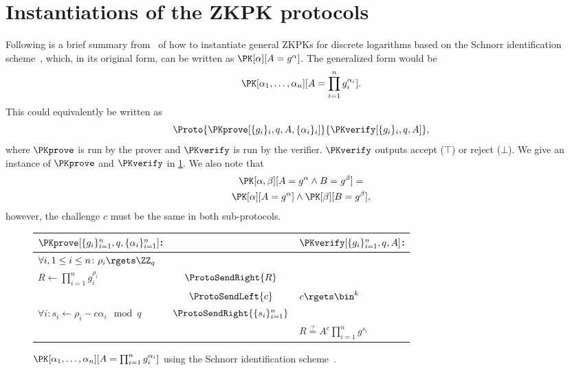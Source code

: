 \section{Instantiations of the \acs{ZKPK} protocols}%
\label{ZKPK-instantiations}

Following is a brief summary from~\cite{Camenisch-phdthesis} of how to 
instantiate general \acp{ZKPK} for discrete logarithms based on the Schnorr 
identification scheme~\cite{Schnorr}, which, in its original form, can be 
written as \(\PK[\alpha][A = g^\alpha]\).
The generalized form would be \[
  \PK[\alpha_1, \dotsc, \alpha_n][A = \prod_{i=1}^n g_i^{\alpha_i}].
\]
This could equivalently be written as
\begin{equation*}
  \Proto%
  {\PKprove[\{g_i\}_i, q, A, \{\alpha_i\}_i]}%
  {\PKverify[\{g_i\}_i, q, A]},
\end{equation*}
where \(\PKprove\) is run by the prover and \(\PKverify\) is run by the 
verifier.
\(\PKverify\) outputs accept (\(\top\)) or reject (\(\bot\)).
We give an instance of \(\PKprove\) and \(\PKverify\) in \cref{PKalgorithms}.
We also note that
\begin{multline*}
  \PK[\alpha, \beta][A = g^\alpha \land B = g^\beta] = \\
  \PK[\alpha][A = g^\alpha] \land \PK[\beta][B = g^\beta],
\end{multline*}
however, the challenge \(c\) must be the same in both sub-protocols.

\begin{figure*}
  \small
  \begin{tabular}{lcl}
    \(\PKprove[\{g_i\}_{i=1}^n, q, \{\alpha_i\}_{i=1}^n]\):
    &
    & \(\PKverify[\{g_i\}_{i=1}^n, q, A]\):
    \\
    \midrule

    \(\forall i, 1\leq i\leq n\colon \rho_i\rgets \ZZ_q\)
    &
    &
    \\

    \(R\gets \prod_{i=1}^n g_i^{\rho_i}\)
    & \(\ProtoSendRight{R}\)
    &
    \\

    & \(\ProtoSendLeft{c}\)
    & \(c\rgets \bin^k\)
    \\

    \(\forall i\colon s_i\gets \rho_i - c\alpha_i \mod q\)
    & \(\ProtoSendRight{\{s_i\}_{i=1}^n}\)
    &
    \\

    &
    & \(R \stackrel{?}{=} A^c \prod_{i=1}^n g^{s_i}\)
    \\
    
  \end{tabular}
  \caption{%
    \(\PK[\alpha_1, \dotsc, \alpha_n][A = \prod_{i=1}^n g_i^{\alpha_i}]\) using 
    the Schnorr identification scheme~\cite{Camenisch-phdthesis}.
  }%
  \label{PKalgorithms}
\end{figure*}

